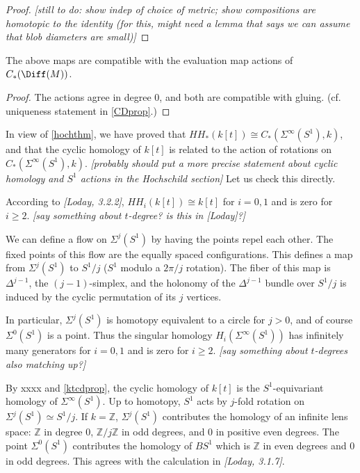 \documentclass[11pt,leqno]{amsart}
\def\z{\mathbb{Z}}
\def\nn#1{{{\it \small [#1]}}}
\begin{document}
\begin{proof}
\nn{still to do: show indep of choice of metric; show compositions are homotopic to the identity
(for this, might need a lemma that says we can assume that blob diameters are small)}
\end{proof}


\begin{prop} \label{ktcdprop}
The above maps are compatible with the evaluation map actions of $C_*(\Diff(M))$.
\end{prop}

\begin{proof}
The actions agree in degree 0, and both are compatible with gluing.
(cf. uniqueness statement in \ref{CDprop}.)
\end{proof}

\medskip

In view of \ref{hochthm}, we have proved that $HH_*(k[t]) \cong C_*(\Sigma^\infty(S^1), k)$,
and that the cyclic homology of $k[t]$ is related to the action of rotations
on $C_*(\Sigma^\infty(S^1), k)$.
\nn{probably should put a more precise statement about cyclic homology and $S^1$ actions in the Hochschild section}
Let us check this directly.

According to \nn{Loday, 3.2.2}, $HH_i(k[t]) \cong k[t]$ for $i=0,1$ and is zero for $i\ge 2$.
\nn{say something about $t$-degree?  is this in [Loday]?}

We can define a flow on $\Sigma^j(S^1)$ by having the points repel each other.
The fixed points of this flow are the equally spaced configurations.
This defines a map from $\Sigma^j(S^1)$ to $S^1/j$ ($S^1$ modulo a $2\pi/j$ rotation).
The fiber of this map is $\Delta^{j-1}$, the $(j-1)$-simplex, 
and the holonomy of the $\Delta^{j-1}$ bundle
over $S^1/j$ is induced by the cyclic permutation of its $j$ vertices.

In particular, $\Sigma^j(S^1)$ is homotopy equivalent to a circle for $j>0$, and
of course $\Sigma^0(S^1)$ is a point.
Thus the singular homology $H_i(\Sigma^\infty(S^1))$ has infinitely many generators for $i=0,1$
and is zero for $i\ge 2$.
\nn{say something about $t$-degrees also matching up?}

By xxxx and \ref{ktcdprop}, 
the cyclic homology of $k[t]$ is the $S^1$-equivariant homology of $\Sigma^\infty(S^1)$.
Up to homotopy, $S^1$ acts by $j$-fold rotation on $\Sigma^j(S^1) \simeq S^1/j$.
If $k = \z$, $\Sigma^j(S^1)$ contributes the homology of an infinite lens space: $\z$ in degree
0, $\z/j \z$ in odd degrees, and 0 in positive even degrees.
The point $\Sigma^0(S^1)$ contributes the homology of $BS^1$ which is $\z$ in even 
degrees and 0 in odd degrees.
This agrees with the calculation in \nn{Loday, 3.1.7}.
\end{document}
